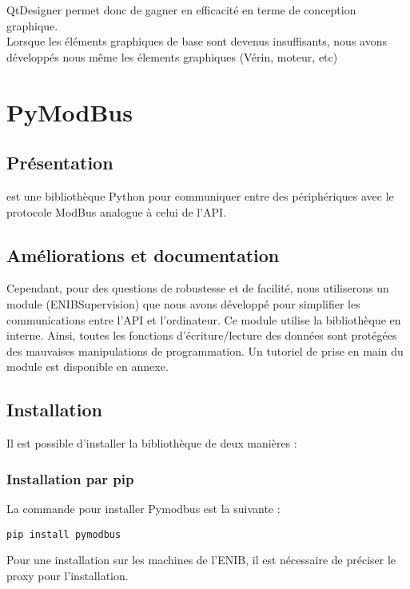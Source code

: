 {QtDesigner permet donc de gagner en efficacité en terme de conception graphique. \\
Lorsque les éléments graphiques de base sont devenus insuffisants, nous avons développés nous même les élements graphiques (Vérin, moteur, etc)



\section{PyModBus}
\subsection{Présentation}
 est une bibliothèque Python pour communiquer entre des périphériques avec le protocole ModBus analogue à celui de l'API.

\subsection{Améliorations et documentation}

Cependant, pour des questions de robustesse et de facilité, nous utiliserons un module (ENIBSupervision) que nous avons développé pour simplifier les communications entre l'API et l'ordinateur. \newline
Ce module utilise la bibliothèque  en interne.
 Ainsi, toutes les fonctions d'écriture/lecture des données sont protégées des mauvaises manipulations de programmation. \newline
Un tutoriel de prise en main du module  est disponible en annexe.

\subsection{Installation}

Il est possible d'installer la bibliothèque  de deux manières : \newline

\subsubsection{Installation par pip}
La commande pour installer Pymodbus est la suivante :
\begin{lstlisting}
pip install pymodbus
\end{lstlisting}

Pour une installation sur les machines de l'ENIB, il est nécessaire de préciser le proxy pour l'installation. \newline 

}
